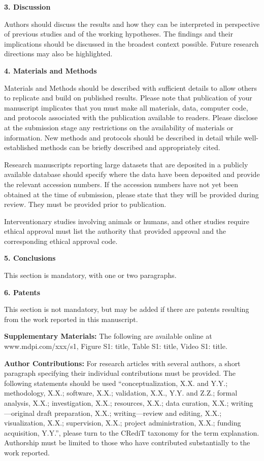 \documentclass{article} %
\begin{document}
\noindent \textbf{3. Discussion}

Authors should discuss the results and how they can be interpreted in perspective of previous studies and of the working hypotheses. The findings and their implications should be discussed in the broadest context possible. Future research directions may also be highlighted.

\noindent \textbf{4. Materials and Methods }

Materials and Methods should be described with sufficient details to allow others to replicate and build on published results. Please note that publication of your manuscript implicates that you must make all materials, data, computer code, and protocols associated with the publication available to readers. Please disclose at the submission stage any restrictions on the availability of materials or information. New methods and protocols should be described in detail while well-established methods can be briefly described and appropriately cited.

Research manuscripts reporting large datasets that are deposited in a publicly available database should specify where the data have been deposited and provide the relevant accession numbers. If the accession numbers have not yet been obtained at the time of submission, please state that they will be provided during review. They must be provided prior to publication.

Interventionary studies involving animals or humans, and other studies require ethical approval must list the authority that provided approval and the corresponding ethical approval code. 

\noindent \textbf{5. Conclusions}

This section is mandatory, with one or two paragraphs.

\noindent \textbf{6. Patents}

This section is not mandatory, but may be added if there are patents resulting from the work reported in this manuscript.

\noindent \textbf{Supplementary Materials:} The following are available online at www.mdpi.com/xxx/s1, Figure S1: title, Table S1: title, Video S1: title. 

\noindent \textbf{Author Contributions: }For research articles with several authors, a short paragraph specifying their individual contributions must be provided. The following statements should be used ``conceptualization, X.X. and Y.Y.; methodology, X.X.; software, X.X.; validation, X.X., Y.Y. and Z.Z.; formal analysis, X.X.; investigation, X.X.; resources, X.X.; data curation, X.X.; writing---original draft preparation, X.X.; writing---review and editing, X.X.; visualization, X.X.; supervision, X.X.; project administration, X.X.; funding acquisition, Y.Y.'', please turn to the CRediT taxonomy for the term explanation. Authorship must be limited to those who have contributed substantially to the work reported.
\end{document}
